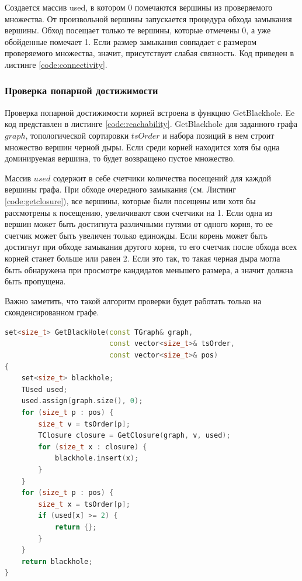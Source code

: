 \documentclass[12pt,a4paper,oneside,openany]{article}
\theoremstyle{definition}
\theoremstyle{lemma}
\theoremstyle{remark}
\begin{document}
Создается массив used, в котором 0 помечаются вершины из проверяемого множества.
От произвольной вершины запускается процедура обхода замыкания вершины.
Обход посещает только те вершины, которые отмечены 0, а уже обойденные
помечает 1.
Если размер замыкания совпадает с размером проверяемого множества, значит,
присутствует слабая связность. Код приведен в листинге \ref{code:connectivity}.

\subsubsection{Проверка попарной достижимости}\label{subsubsec:reachabilitycheck}

Проверка попарной достижимости корней встроена в функцию GetBlackhole.
Ee код представлен в листинге \ref{code:reachability}.
GetBlackhole для заданного графа $graph$, топологической сортировки $tsOrder$ и набора позиций в нем
строит множество вершин черной дыры. Если среди корней находится хотя бы одна доминируемая вершина,
то будет возвращено пустое множество.

Массив $used$ содержит в себе счетчики количества посещений для каждой вершины графа.
При обходе очередного замыкания (см. Листинг \ref{code:getclosure}), все вершины, которые
были посещены или хотя бы рассмотрены к посещению, увеличивают свои счетчики на 1.
Если одна из вершин может быть достигнута различными путями от одного корня,
то ее счетчик может быть увеличен только единожды. Если корень может быть достигнут
при обходе замыкания другого корня, то его счетчик после обхода всех корней станет больше или равен 2.
Если это так, то такая черная дыра могла быть обнаружена при просмотре кандидатов меньшего размера,
а значит должна быть пропущена.

Важно заметить, что такой алгоритм проверки будет работать только на сконденсированном графе.

\begin{lstlisting}[language=C++, caption=Получить черную дыру по набору корней, label=code:reachability]
set<size_t> GetBlackHole(const TGraph& graph,
                         const vector<size_t>& tsOrder,
                         const vector<size_t>& pos)
{
    set<size_t> blackhole;
    TUsed used;
    used.assign(graph.size(), 0);
    for (size_t p : pos) {
        size_t v = tsOrder[p];
        TClosure closure = GetClosure(graph, v, used);
        for (size_t x : closure) {
            blackhole.insert(x);
        }
    }
    for (size_t p : pos) {
        size_t x = tsOrder[p];
        if (used[x] >= 2) {
            return {};
        }
    }
    return blackhole;
}
\end{lstlisting}
\end{document}
